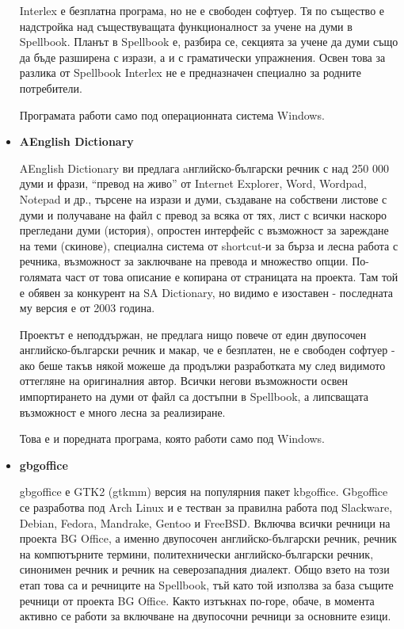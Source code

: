 \begin{itemize}
    Interlex е безплатна програма, но не е свободен софтуер. Тя по
    същество е надстройка над съществуващата функционалност за учене
    на думи в Spellbook. Планът в Spellbook е, разбира се, секцията за
    учене да думи също да бъде разширена с изрази, а и с граматически
    упражнения. Освен това за разлика от Spellbook Interlex не е
    предназначен специално за родните потребители.

    Програмата работи само под операционната система Windows.

  \item \textbf{AEnglish Dictionary}

    AEnglish Dictionary ви предлага aнглийско-български речник с над
    250 000 думи и фрази, "`превод на живо"' от Internet Explorer,
    Word, Wordpad, Notepad и др., търсене на изрази и думи, създаване
    на собствени листове с думи и получаване на файл с превод за всяка
    от тях, лист с всички наскоро прегледани думи (история), опростен
    интерфейс с възможност за зареждане на теми (скинове), специална
    система от shortcut-и за бърза и лесна работа с речника,
    възможност за заключване на превода и множество опции. По-голямата
    част от това описание е копирана от страницата на проекта. Там той
    е обявен за конкурент на SA Dictionary, но видимо е изоставен -
    последната му версия е от 2003 година.

    Проектът е неподдържан, не предлага нищо повече от един
    двупосочен английско-български речник и макар, че е безплатен, не
    е свободен софтуер - ако беше такъв някой можеше да продължи
    разработката му след видимото оттегляне на оригиналния
    автор. Всички негови възможности освен импортирането на думи от
    файл са достъпни в Spellbook, а липсващата възможност е много
    лесна за реализиране.

    Това е и поредната програма, която работи само под Windows.

  \item \textbf{gbgoffice}

    gbgoffice е GTK2 (gtkmm) версия на популярния пакет
    kbgoffice. Gbgoffice се разработва под Arch Linux и е тестван за
    правилна работа под Slackware, Debian, Fedora, Mandrake, Gentoo и
    FreeBSD. Включва всички речници на проекта BG Office, а именно
    двупосочен английско-български речник, речник на компютърните
    термини, политехнически английско-български речник, синонимен
    речник и речник на северозападния диалект. Общо взето на този етап
    това са и речниците на Spellbook, тъй като той използва за база
    същите речници от проекта BG Office. Както изтъкнах по-горе,
    обаче, в момента активно се работи за включване на двупосочни
    речници за основните езици. 


\end{itemize}
